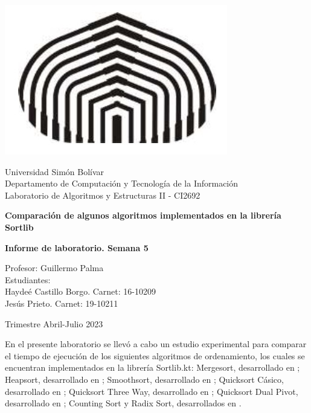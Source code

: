 \documentclass[titlepage]{article}
\begin{document}
	\begin{titlepage}
		\centering
		\includegraphics*[scale=0.2]{logo usb.jpg}
		
		\vspace{0.5cm}		
		
		\large 
		Universidad Sim\'on Bol\'ivar\\
		Departamento de Computaci\'on y Tecnolog\'ia de la Informaci\'on\\
		Laboratorio de Algoritmos y Estructuras II - CI2692
		
		\vspace{7cm}
		
		\LARGE
		\textbf{Comparaci\'on de algunos algoritmos implementados en la librer\'ia Sortlib}
		
		\vspace{0.5cm}
		
		\textbf{Informe de laboratorio. Semana 5}
		
		\vspace{5cm}
		
		\large
		
		Profesor: Guillermo Palma\\
		Estudiantes:\\
		Hayde\'e Castillo Borgo. Carnet: 16-10209\\
		Jes\'us Prieto. Carnet: 19-10211
		
		\vspace{5cm}
		
		Trimestre Abril-Julio 2023
	\end{titlepage}
	
	En el presente laboratorio se llev\'o a cabo un estudio experimental para comparar el tiempo de ejecuci\'on de los siguientes algoritmos de ordenamiento, los cuales se encuentran implementados en la librer\'ia Sortlib.kt: Mergesort, desarrollado en \cite{1}; Heapsort, desarrollado en \cite{2}; Smoothsort, desarrollado en \cite{3}; Quicksort C\'asico, desarrollado en \cite{2}; Quicksort Three Way, desarrollado en \cite{4}; Quicksort Dual Pivot, desarrollado en \cite{5}; Counting Sort y Radix Sort, desarrollados en \cite{2}.\\
	
\end{document}
